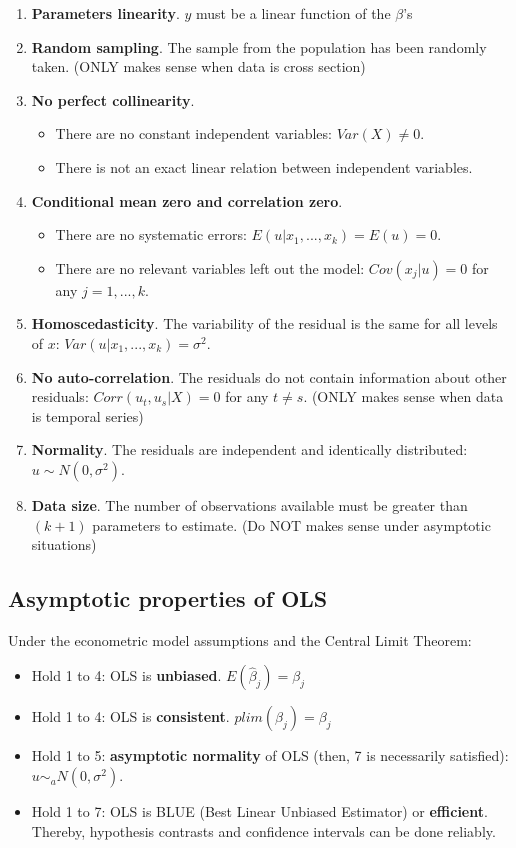 \documentclass[10pt,landscape]{article}
\begin{document}
\begin{multicols}{3}
\begin{enumerate}[leftmargin=*]
\item \textbf{Parameters linearity}. $y$ must be a linear function of the $\beta$'s
\item \textbf{Random sampling}. The sample from the population has been randomly taken. (ONLY makes sense when data is cross section)
\item \textbf{No perfect collinearity}.
\begin{itemize}[leftmargin=*]
\item There are no constant independent variables: $Var(X) \neq 0$.
\item There is not an exact linear relation between independent variables.
\end{itemize}
\item \textbf{Conditional mean zero and correlation zero}.
\begin{itemize}[leftmargin=*]
\item There are no systematic errors: $E(u | x_1, ..., x_k) = E(u) = 0$.
\item There are no relevant variables left out the model: $Cov(x_j | u) = 0$ for any $j = 1, ..., k$.
\end{itemize}
\item \textbf{Homoscedasticity}. The variability of the residual is the same for all levels of $x$: $Var(u | x_1, ..., x_k) = \sigma^2$.
\item \textbf{No auto-correlation}. The residuals do not contain information about other residuals: $Corr(u_t, u_s | X) = 0$ for any $t \neq s$. (ONLY makes sense when data is temporal series)
\item \textbf{Normality}. The residuals are independent and identically distributed: $u \sim N(0,\sigma^2)$.
\item \textbf{Data size}. The number of observations available must be greater than $(k + 1)$ parameters to estimate. (Do NOT makes sense under asymptotic situations)
\end{enumerate}

\subsection*{Asymptotic properties of OLS}

Under the econometric model assumptions and the Central Limit Theorem:
\begin{itemize}[leftmargin=*]
\item Hold 1 to 4: OLS is \textbf{unbiased}. $E(\hat{\beta}_j) = \beta_j$
\item Hold 1 to 4: OLS is \textbf{consistent}. $plim(\hat{\beta}_j) = \beta_j$
\item Hold 1 to 5: \textbf{asymptotic normality} of OLS (then, 7 is necessarily satisfied): $u \sim_a N(0,\sigma^2)$.
\item Hold 1 to 7: OLS is BLUE (Best Linear Unbiased Estimator) or \textbf{efficient}. Thereby, hypothesis contrasts and confidence intervals can be done reliably.
\end{itemize}


\end{multicols}
\end{document}

